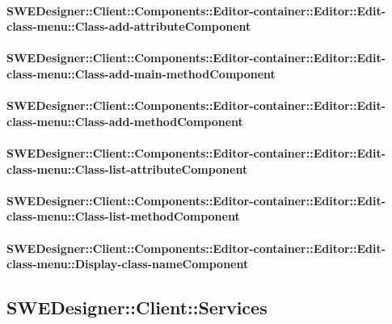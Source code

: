 			\paragraph{SWEDesigner::Client::Components::Editor-container::Editor::Edit-class-menu::Class-add-attributeComponent}
				
				
			\paragraph{SWEDesigner::Client::Components::Editor-container::Editor::Edit-class-menu::Class-add-main-methodComponent}
				
				
			\paragraph{SWEDesigner::Client::Components::Editor-container::Editor::Edit-class-menu::Class-add-methodComponent}
				
				
			\paragraph{SWEDesigner::Client::Components::Editor-container::Editor::Edit-class-menu::Class-list-attributeComponent}
				
				
			\paragraph{SWEDesigner::Client::Components::Editor-container::Editor::Edit-class-menu::Class-list-methodComponent}
				
				
			\paragraph{SWEDesigner::Client::Components::Editor-container::Editor::Edit-class-menu::Display-class-nameComponent}
				
		
	\subsection{SWEDesigner::Client::Services}
